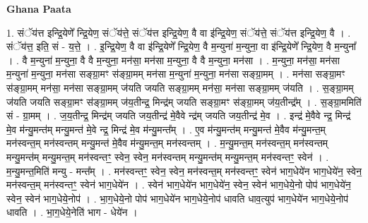 \documentclass[17pt]{extarticle}
\begin{document}
\textbf{Ghana Paata } \newline

1. संॅय॑त्त इन्द्रि॒येणे᳚ न्द्रि॒येण॒ संॅय॑त्ते॒ संॅय॑त्त इन्द्रि॒येण॒ वै वा इ॑न्द्रि॒येण॒ संॅय॑त्ते॒ संॅय॑त्त इन्द्रि॒येण॒ वै । . संॅय॑त्त॒ इति॒ सं - य॒त्ते॒ । . इ॒न्द्रि॒येण॒ वै वा इ॑न्द्रि॒येणे᳚ न्द्रि॒येण॒ वै म॒न्युना॑ म॒न्युना॒ वा इ॑न्द्रि॒येणे᳚ न्द्रि॒येण॒ वै म॒न्युना᳚ । . वै म॒न्युना॑ म॒न्युना॒ वै वै म॒न्युना॒ मन॑सा॒ मन॑सा म॒न्युना॒ वै वै म॒न्युना॒ मन॑सा । . म॒न्युना॒ मन॑सा॒ मन॑सा म॒न्युना॑ म॒न्युना॒ मन॑सा सङ्ग्रा॒मꣳ स॑ङ्ग्रा॒मम् मन॑सा म॒न्युना॑ म॒न्युना॒ मन॑सा सङ्ग्रा॒मम् । . मन॑सा सङ्ग्रा॒मꣳ स॑ङ्ग्रा॒मम् मन॑सा॒ मन॑सा सङ्ग्रा॒मम् ज॑यति जयति सङ्ग्रा॒मम् मन॑सा॒ मन॑सा सङ्ग्रा॒मम् ज॑यति । . स॒ङ्ग्रा॒मम् ज॑यति जयति सङ्ग्रा॒मꣳ स॑ङ्ग्रा॒मम् ज॑य॒तीन्द्र॒ मिन्द्र॑म् जयति सङ्ग्रा॒मꣳ स॑ङ्ग्रा॒मम् ज॑य॒तीन्द्र᳚म् । . स॒ङ्ग्रा॒ममिति॑ सं - ग्रा॒मम् । . ज॒य॒तीन्द्र॒ मिन्द्र॑म् जयति जय॒तीन्द्र॑ मे॒वैवे न्द्र॑म् जयति जय॒तीन्द्र॑ मे॒व । . इन्द्र॑ मे॒वैवे न्द्र॒ मिन्द्र॑ मे॒व म॑न्यु॒मन्त॑म् मन्यु॒मन्त॑ मे॒वे न्द्र॒ मिन्द्र॑ मे॒व म॑न्यु॒मन्त᳚म् । . ए॒व म॑न्यु॒मन्त॑म् मन्यु॒मन्त॑ मे॒वैव म॑न्यु॒मन्त॒म् मन॑स्वन्त॒म् मन॑स्वन्तम् मन्यु॒मन्त॑ मे॒वैव म॑न्यु॒मन्त॒म् मन॑स्वन्तम् । . म॒न्यु॒मन्त॒म् मन॑स्वन्त॒म् मन॑स्वन्तम् मन्यु॒मन्त॑म् मन्यु॒मन्त॒म् मन॑स्वन्तꣳ॒॒ स्वेन॒ स्वेन॒ मन॑स्वन्तम् मन्यु॒मन्त॑म् मन्यु॒मन्त॒म् मन॑स्वन्तꣳ॒॒ स्वेन॑ । . म॒न्यु॒मन्त॒मिति॑ मन्यु - मन्त᳚म् । . मन॑स्वन्तꣳ॒॒ स्वेन॒ स्वेन॒ मन॑स्वन्त॒म् मन॑स्वन्तꣳ॒॒ स्वेन॑ भाग॒धेये॑न भाग॒धेये॑न॒ स्वेन॒ मन॑स्वन्त॒म् मन॑स्वन्तꣳ॒॒ स्वेन॑ भाग॒धेये॑न । . स्वेन॑ भाग॒धेये॑न भाग॒धेये॑न॒ स्वेन॒ स्वेन॑ भाग॒धेये॒नो पोप॑ भाग॒धेये॑न॒ स्वेन॒ स्वेन॑ भाग॒धेये॒नोप॑ । . भा॒ग॒धेये॒नो पोप॑ भाग॒धेये॑न भाग॒धेये॒नोप॑ धावति धाव॒त्युप॑ भाग॒धेये॑न भाग॒धेये॒नोप॑ धावति । . भा॒ग॒धेये॒नेति॑ भाग - धेये॑न । \newline
\end{document}

